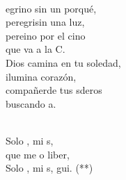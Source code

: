\documentclass[12pt]{article}
\begin{document}
\begin{multicols*}{2}
\begin{cancion}
	\jump\\
	egrino sin un porqué,\\
	peregrisin una luz,\\
	pereino por el cino \\
	que va a la C. \\
Dios camina en tu soledad,\\
	ilumina corazón,\\
	compañerde tus sderos \\
	buscando a. \\\jump\\
	\begin{chorus}%
	Solo , mi s,\\
	que me o liber,\\
	Solo , mi s, gui. (**) \\
	\end{chorus}%
	\jump\\
\end{cancion}%


\end{multicols*}
\end{document}
